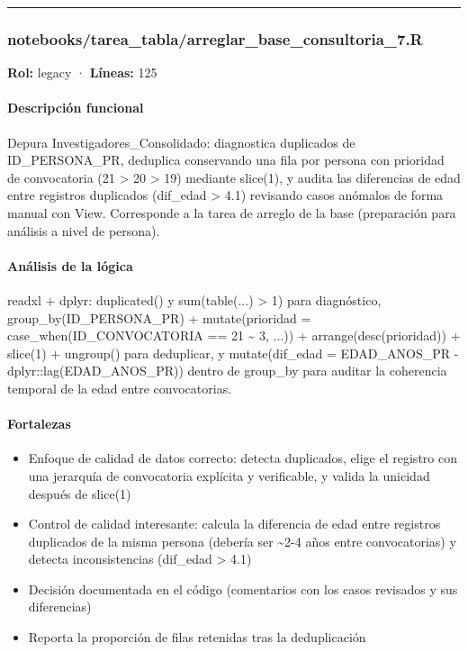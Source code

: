 \medskip
\hrule

\subsubsection{notebooks/tarea\_tabla/arreglar\_base\_consultoria\_7.R}
\textbf{Rol:} legacy · \textbf{Líneas:} 125

\paragraph{Descripción funcional}
Depura Investigadores\_Consolidado: diagnostica duplicados de ID\_PERSONA\_PR, deduplica conservando una fila por persona con prioridad de convocatoria (21 > 20 > 19) mediante slice(1), y audita las diferencias de edad entre registros duplicados (dif\_edad > 4.1) revisando casos anómalos de forma manual con View. Corresponde a la tarea de arreglo de la base (preparación para análisis a nivel de persona).

\paragraph{Análisis de la lógica}
readxl + dplyr: duplicated() y sum(table(...) > 1) para diagnóstico, group\_by(ID\_PERSONA\_PR) + mutate(prioridad = case\_when(ID\_CONVOCATORIA == 21 \textasciitilde{} 3, ...)) + arrange(desc(prioridad)) + slice(1) + ungroup() para deduplicar, y mutate(dif\_edad = EDAD\_ANOS\_PR - dplyr::lag(EDAD\_ANOS\_PR)) dentro de group\_by para auditar la coherencia temporal de la edad entre convocatorias.

\paragraph{Fortalezas}
\begin{itemize}
  \item Enfoque de calidad de datos correcto: detecta duplicados, elige el registro con una jerarquía de convocatoria explícita y verificable, y valida la unicidad después de slice(1)
  \item Control de calidad interesante: calcula la diferencia de edad entre registros duplicados de la misma persona (debería ser \textasciitilde{}2-4 años entre convocatorias) y detecta inconsistencias (dif\_edad > 4.1)
  \item Decisión documentada en el código (comentarios con los casos revisados y sus diferencias)
  \item Reporta la proporción de filas retenidas tras la deduplicación
\end{itemize}

